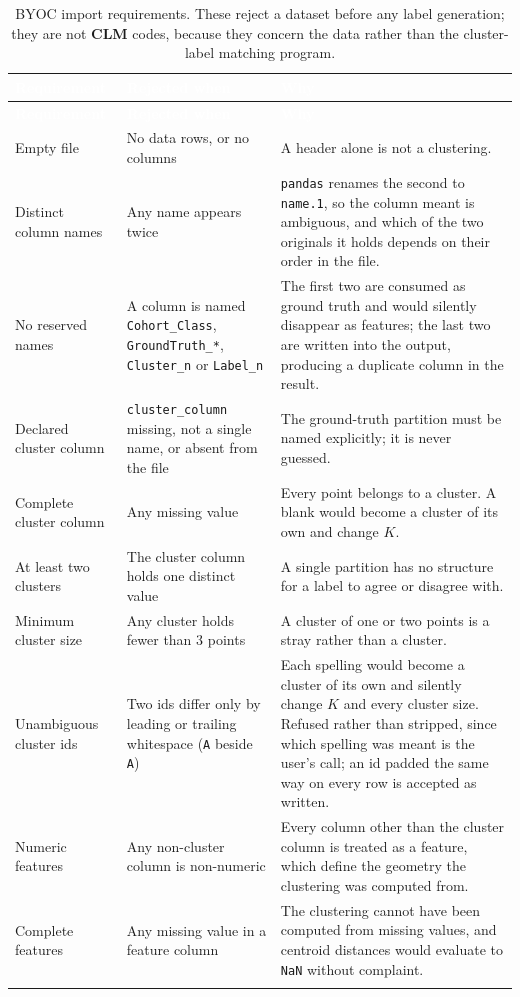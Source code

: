\documentclass[a4paper,11pt]{article}
\newcommand{\vcode}[1]{\textcolor{valred}{\bfseries\ttfamily #1}}
\newcommand{\headrow}{\rowcolor{headblue}}
\newcommand{\hc}[1]{\textcolor{white}{\bfseries #1}}
\begin{document}
\begin{longtable}{@{}L{4.0cm} L{5.2cm} L{6.4cm}@{}}
\toprule
\headrow \hc{Requirement} & \hc{Rejected when} & \hc{Why} \\
\midrule
\endfirsthead
\headrow \hc{Requirement} & \hc{Rejected when} & \hc{Why} \\ \midrule
\endhead
Empty file & No data rows, or no columns & A header alone is not a clustering. \\
Distinct column names & Any name appears twice & \texttt{pandas} renames the second to \texttt{name.1}, so the column meant is ambiguous, and which of the two originals it holds depends on their order in the file. \\
No reserved names & A column is named \texttt{Cohort\_Class}, \texttt{GroundTruth\_*}, \texttt{Cluster\_n} or \texttt{Label\_n} & The first two are consumed as ground truth and would silently disappear as features; the last two are written into the output, producing a duplicate column in the result. \\
Declared cluster column & \texttt{cluster\_column} missing, not a single name, or absent from the file & The ground-truth partition must be named explicitly; it is never guessed. \\
Complete cluster column & Any missing value & Every point belongs to a cluster. A blank would become a cluster of its own and change $K$. \\
At least two clusters & The cluster column holds one distinct value & A single partition has no structure for a label to agree or disagree with. \\
Minimum cluster size & Any cluster holds fewer than $3$ points & A cluster of one or two points is a stray rather than a cluster. \\
Unambiguous cluster ids & Two ids differ only by leading or trailing whitespace (\texttt{A} beside \texttt{A\textvisiblespace}) & Each spelling would become a cluster of its own and silently change $K$ and every cluster size. Refused rather than stripped, since which spelling was meant is the user's call; an id padded the same way on every row is accepted as written. \\
Numeric features & Any non-cluster column is non-numeric & Every column other than the cluster column is treated as a feature, which define the geometry the clustering was computed from. \\
Complete features & Any missing value in a feature column & The clustering cannot have been computed from missing values, and centroid distances would evaluate to \texttt{NaN} without complaint. \\
\bottomrule
\caption{BYOC import requirements. These reject a dataset before any label generation; they are not \vcode{CLM} codes, because they concern the data rather than the cluster-label matching program.}
\end{longtable}
\end{document}
